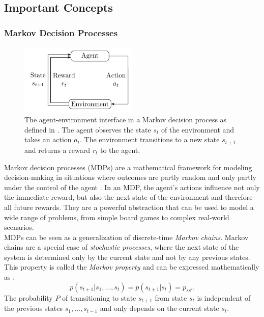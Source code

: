 \subsection{Important Concepts}

\subsubsection{Markov Decision Processes}
\begin{figure}[h]
    \centering
    \includegraphics[width=0.5\textwidth]{agent_env_interface.pdf}
    \caption{The agent-environment interface in a Markov decision process as defined in \cite[chapter 3.1]{sutton_reinforcement_nodate}. The agent observes the state $s_t$ of the environment and takes an action $a_t$. The environment transitions to a new state $s_{t+1}$ and returns a reward $r_{t}$ to the agent.}
    \label{fig:agent-env-interface}
\end{figure}
Markov decision processes (MDPs) are a mathematical framework for modeling decision-making in situations where outcomes are partly random and only partly under the control of the agent \cite[chapter 3]{sutton_reinforcement_nodate}.
In an MDP, the agent's actions influence not only the immediate reward, but also the next state of the environment and therefore all future rewards.
They are a powerful abstraction that can be used to model a wide range of problems, from simple board games to complex real-world scenarios.
\\
MDPs can be seen as a generalization of discrete-time \textit{Markov chains}.
Markov chains are a special case of \textit{stochastic processes}, where the next state of the system is determined only by the current state and not by any previous states.
This property is called the \textit{Markov property} and can be expressed mathematically as \cite{serfozo_markov_2009}:
\begin{equation}
    p(s_{t+1} | s_1, \dots, s_t) = p(s_{t+1} | s_t) = p_{ss'} \text{.}
    \label{eq:markov-property}
\end{equation}
The probability $P$ of transitioning to state $s_{t+1}$ from state $s_t$ is independent of the previous states $s_1, \dots, s_{t-1}$ and only depends on the current state $s_t$.
